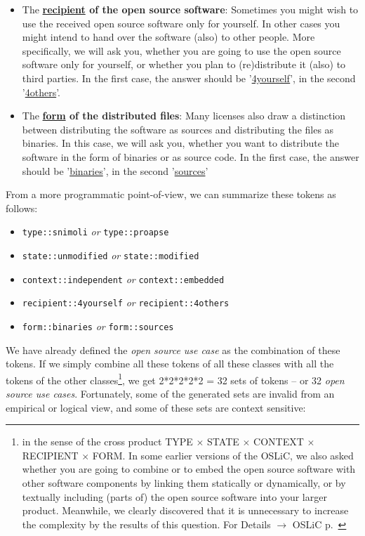 \begin{itemize}
  \item The \textbf{\underline{recipient} of the open source software}:
  Sometimes you might wish to use the received open source software only for
  yourself. In other cases you might intend to hand over the software (also) to
  other people. More specifically, we will ask you, whether you are going to use
  the open source software only for yourself, or whether you plan to
  (re)distribute it (also) to third parties. In the first case, the answer
  should be '\underline{4yourself}', in the second '\underline{4others}'.
 
  \item The \textbf{\underline{form} of the distributed files}: Many licenses
  also draw a distinction between distributing the software as sources and
  distributing the files as binaries. In this case, we will ask you, whether you
  want to distribute the software in the form of binaries or as source code. In
  the first case, the answer should be '\underline{binaries}', in the second
  '\underline{sources}'
  
\end{itemize}

From a more programmatic point-of-view, we can summarize these tokens as
follows:

\begin{itemize}
  \item \texttt{type::snimoli} \emph{or} \texttt{type::proapse}
  \item \texttt{state::unmodified} \emph{or} \texttt{state::modified}
  \item \texttt{context::independent} \emph{or} \texttt{context::embedded}
  \item \texttt{recipient::4yourself} \emph{or} \texttt{recipient::4others}
  \item \texttt{form::binaries} \emph{or} \texttt{form::sources}
\end{itemize}

We have already defined the \emph{open source use case} as the combination of
these tokens. If we simply combine all these tokens of all these classes with
all the tokens of the other classes\footnote{in the sense of the cross product
TYPE $\times$ STATE $\times$ CONTEXT $\times$ RECIPIENT $\times$ FORM. In some
earlier versions of the OSLiC, we also asked whether you are going to combine or
to embed the open source software with other software components by linking them
statically or dynamically, or by textually including (parts of) the open source
software into your larger product. Meanwhile, we clearly discovered that it is
unnecessary to increase the complexity by the results of this question. For
Details $\rightarrow$ OSLiC p.\ \pageref{sec:LinkingSecondary}}, we get
2*2*2*2*2 = 32 sets of tokens -- or 32 \emph{open source use cases}.
Fortunately, some of the generated sets are invalid from an empirical or logical
view, and some of these sets are context sensitive:

